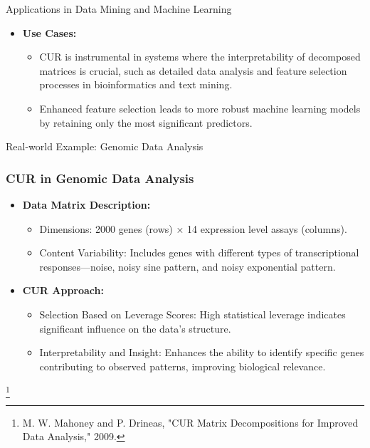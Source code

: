 \documentclass[pdf]{beamer}
\begin{document}
\begin{frame}{Applications in Data Mining and Machine Learning}
    \begin{itemize}
        \item \textbf{Use Cases:}
            \begin{itemize}
                \item CUR is instrumental in systems where the interpretability of decomposed matrices is crucial, such as detailed data analysis and feature selection processes in bioinformatics and text mining.
                \item Enhanced feature selection leads to more robust machine learning models by retaining only the most significant predictors.
            \end{itemize}
    \end{itemize}
\end{frame}

\begin{frame}{Real-world Example: Genomic Data Analysis}
    \frametitle{CUR in Genomic Data Analysis}
    \begin{itemize}
        \item \textbf{Data Matrix Description:}
        \begin{itemize}
            \item Dimensions: 2000 genes (rows) × 14 expression level assays (columns).
            \item Content Variability: Includes genes with different types of transcriptional responses—noise, noisy sine pattern, and noisy exponential pattern.
        \end{itemize}
        \item \textbf{CUR Approach:}
        \begin{itemize}
            \item Selection Based on Leverage Scores: High statistical leverage indicates significant influence on the data's structure.
            \item Interpretability and Insight: Enhances the ability to identify specific genes contributing to observed patterns, improving biological relevance.
        \end{itemize}
    \end{itemize}
    \footnote{M. W. Mahoney and P. Drineas, "CUR Matrix Decompositions for Improved Data Analysis," 2009.}
\end{frame}
\end{document}
